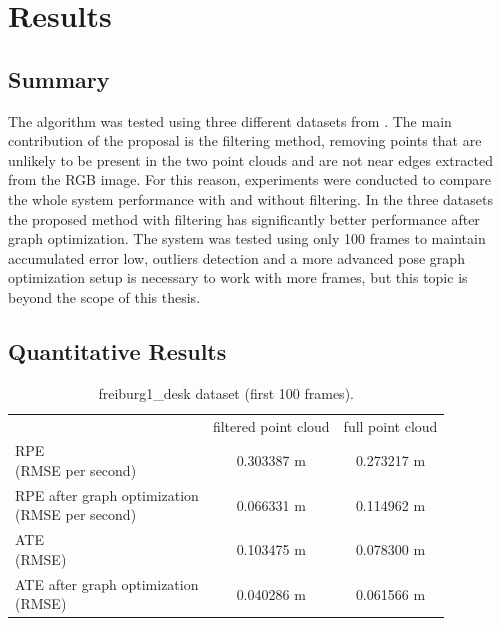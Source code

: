 \section{Results}
\subsection{Summary}

     The algorithm was tested using three different datasets from \cite{sturm12iros}. The main contribution of the 
proposal is the filtering method, removing points that are unlikely to be present in the two point clouds and are not 
near edges extracted from the RGB image. For this reason, experiments were conducted to compare the whole system performance 
with and without filtering. In the three datasets the proposed method with filtering has significantly better performance after 
graph optimization. The system was tested using only 100 frames to maintain accumulated error low, outliers detection and a more advanced  
pose graph optimization setup is necessary to work with more frames, but this topic is beyond the scope of this thesis.

\subsection{Quantitative Results}
\begin{center}
\begin{table}[H]
\begin{tabular}{ |l|c|c|}
\hline & filtered point cloud & full point cloud \\
\pbox{20cm}{RPE \\ (RMSE per second)} & 0.303387 m & 0.273217 m \\
\hline
\pbox{20cm} {RPE after graph optimization \\ (RMSE per second)} &  0.066331 m &  0.114962 m\\
\hline
\pbox{20cm}{ATE \\ (RMSE)} & 0.103475 m & 0.078300 m\\
\hline
\pbox{20cm} {ATE after graph optimization \\ (RMSE)} & 0.040286 m & 0.061566 m\\
\hline
\end{tabular}
\caption{freiburg1\_desk dataset (first 100 frames).}
\label{table:quantfd1}
\end{table}
\end{center}


